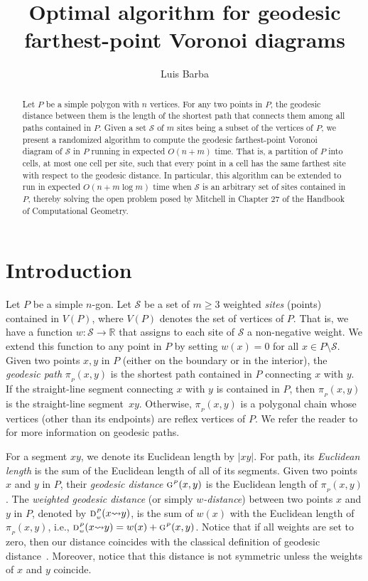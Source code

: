 \documentclass[a4paper,UKenglish]{socg-lipics-v2018}
\title{Optimal algorithm for geodesic farthest-point Voronoi diagrams}
\author{Luis Barba}{Department of Computer Science, ETH Z\"urich, Switzerland}{luis.barba@inf.ethz.ch}{}{}
\newcommand{\s}{\mathcal S}
\newcommand{\g}[3][P]{\ensuremath{\textsc{g}^{\scriptscriptstyle #1}(#2, #3)}}
\newcommand{\dd}[3][P]{\ensuremath{\textsc{d}_{\scriptscriptstyle w}^{\scriptscriptstyle #1}(#2 {\leadsto} #3)}}
\newcommand{\p}[3][P]{\ensuremath{\pi_{_{#1}}(#2, #3)}}
\begin{document}
\maketitle

\begin{abstract}
Let $P$ be a simple polygon with $n$ vertices.
For any two points in $P$, the geodesic distance between them is the length of the shortest path that connects them among all paths contained in $P$. 
Given a set $\s$ of $m$ sites being a subset of  the vertices of $P$, we present a randomized algorithm to compute the geodesic farthest-point Voronoi diagram of $\s$ in $P$ running in expected $O(n + m)$ time. 
That is, a partition of $P$ into cells, at most one cell per site, such that every point in a cell has the same farthest site with respect to the geodesic distance. 
In particular, this algorithm can be extended to run in expected $O(n + m\log m)$ time when $\s$ is an arbitrary set of sites contained in $P$, thereby solving the open problem posed by Mitchell in Chapter 27 of the Handbook of Computational Geometry.
\end{abstract}



\section{Introduction}
Let $P$ be a simple $n$-gon.
Let $\s$ be a set of $m\geq 3$ weighted \emph{sites} (points) contained in $V(P)$, where $V(P)$ denotes the set of vertices of $P$. 
That is, we have a function $w:\s\to \mathbb{R}$ that assigns to each site of $\s$ a non-negative weight. 
We extend this function to any point in $P$ by setting $w(x) = 0$ for all $x\in P\setminus \s$.
Given two points $x,y$ in $P$ (either on the boundary or in the interior), the \emph{geodesic path} $\p{x}{y}$ is the shortest path contained in $P$ connecting $x$ with $y$. If the straight-line segment connecting $x$ with $y$ is contained in $P$, then $\p{x}{y}$ is the straight-line segment~$xy$. 
Otherwise, $\p{x}{y}$ is a polygonal chain whose vertices (other than its endpoints) are  reflex vertices of $P$. 
We refer the reader to~\cite{m-gspno-00} for more information on geodesic paths.

For a segment $xy$, we denote its Euclidean length by $|xy|$. For path, its \emph{Euclidean length} is the sum of the Euclidean length of all of its segments. Given two points $x$ and $y$ in $P$, their \emph{geodesic distance} $\g{x}{y}$ is the Euclidean length of $\p{x}{y}$.
The \emph{weighted geodesic distance} (or simply \emph{$w$-distance}) between two points $x$ and $y$ in $P$, denoted by $\dd{x}{y}$, is the sum of $w(x)$ with the Euclidean length of $\p{x}{y}$, i.e., $\dd{x}{y} = w(x) + \g{x}{y}$. Notice that if all weights are set to zero, then our distance coincides with the classical definition of geodesic distance~\cite{m-gspno-00}. 
Moreover, notice that this distance is not symmetric unless the weights of $x$ and $y$ coincide. 
\end{document}
